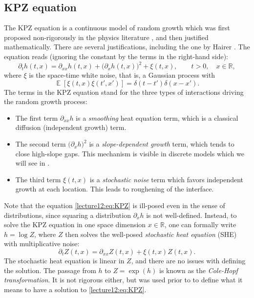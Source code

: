 \documentclass[letterpaper,11pt,oneside,reqno]{book}
\numberwithin{equation}{chapter}  %
\theoremstyle{definition}
\begin{document}
\subsection{KPZ equation}

The KPZ equation is a continuous model of random growth which was first proposed
non-rigorously in the physics literature \cite{KPZ1986}, and then
justified mathematically. There are several justifications,
including the one by Hairer \cite{Hairer11}.
The equation reads (ignoring the constant by the terms in the right-hand side):
\begin{equation}
	\label{lecture12:eq:KPZ}
	\partial_t h(t,x) = \partial_{xx} h(t,x)+\big(\partial_x h(t,x)\big)^2 + \xi(t,x),
	\qquad t>0,\quad x\in\mathbb{R},
\end{equation}
where $\xi$ is the space-time white noise, that is, a Gaussian process with
\begin{equation*}
	\operatorname{\mathbb{E}}[\xi(t,x)\xi(t',x')] = \delta(t-t')\delta(x-x').
\end{equation*}
The terms in the KPZ equation stand for the three types of interactions
driving the random growth process:
\begin{itemize}
	\item The first term $\partial_{xx} h$ is a
		\emph{smoothing} heat equation term, which is a
		classical diffusion (independent growth) term.
	\item The second term $\big(\partial_x h\big)^2$ is a \emph{slope-dependent growth} term, which
		tends to close high-slope gaps. This mechanism is visible in discrete models
		which we will see in .
	\item The third term $\xi(t,x)$ is a \emph{stochastic noise} term
		which favors independent growth at each location.
		This leads to roughening of the interface.
\end{itemize}

Note that the equation \eqref{lecture12:eq:KPZ}
is ill-posed even in the sense of distributions,
since squaring a distribution $\partial_x h$ is not well-defined.
Instead, to solve the KPZ equation in one space dimension $x\in\mathbb{R}$,
one can formally write $h=\log Z$, where $Z$ then solves the well-posed
\emph{stochastic heat equation} (SHE) with multiplicative noise:
\begin{equation*}
	\partial_t Z(t,x) = \partial_{xx} Z(t,x) + \xi(t,x)Z(t,x).
\end{equation*}
The stochastic heat equation is linear in $Z$, and there are no issues with
defining the solution. The passage from $h$ to $Z=\exp(h)$ is known as the
\emph{Cole-Hopf transformation}. It is not rigorous either, but
was used prior to \cite{Hairer11} to define what it means to have a solution
to \eqref{lecture12:eq:KPZ}.
\end{document}
